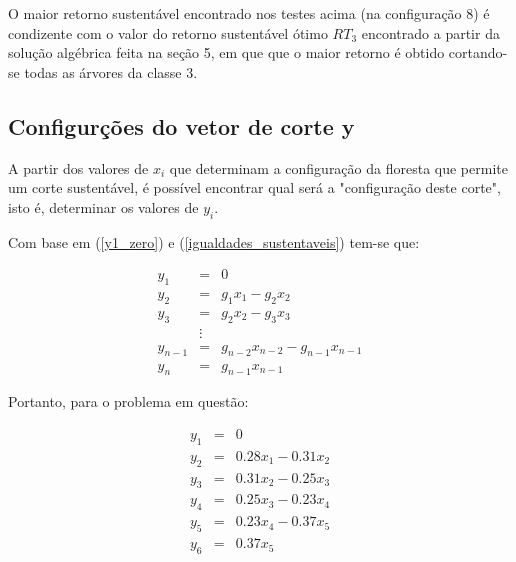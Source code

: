 \documentclass[a4paper, 12pt]{article}
\begin{document}
O maior retorno sustentável encontrado nos testes acima (na configuração 8) é condizente com o valor do retorno sustentável ótimo $RT_3$ encontrado a partir da solução algébrica feita na seção 5, em que que o maior retorno é obtido cortando-se todas as árvores da classe 3. 

\subsection{Configurções do vetor de corte y}

A partir dos valores de $x_i$ que determinam a configuração da floresta que permite um corte sustentável, é possível encontrar qual será a "configuração deste corte", isto é, determinar os valores de $y_i$.

Com base em (\ref{y1_zero}) e (\ref{igualdades_sustentaveis}) tem-se que:

$$    \begin {matrix}
    y_1&=&0 \\ 
    y_2 & = &g_1 x_1 - g_2 x_2 \\
    y_3 & = &g_2 x_2 - g_3 x_3 \\
    & \vdots &  \\
    y_{n-1} & = &g_{n-2} x_{n-2} - g_{n-1} x_{n-1} \\
    y_n & = & g_{n-1} x_{n-1}
    \end {matrix}$$
    
Portanto, para o problema em questão:

$$    \begin {matrix}
    y_1 & = & 0 \\ 
    y_2 & = & 0.28 x_1 - 0.31 x_2 \\
    y_3 & = & 0.31 x_2 - 0.25 x_3 \\
    y_4 & = & 0.25 x_3 - 0.23 x_4 \\
    y_5 & = & 0.23 x_4 - 0.37 x_5 \\
    y_6 & = & 0.37 x_5
    \end {matrix}$$
    
\end{document}
